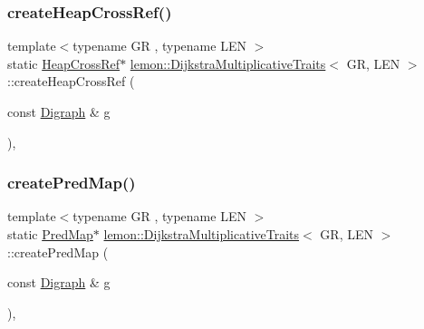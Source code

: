 \subsubsection{\texorpdfstring{create\+Heap\+Cross\+Ref()}{createHeapCrossRef()}}
{\footnotesize\ttfamily template$<$typename GR , typename L\+EN $>$ \\
static \hyperlink{structlemon_1_1_dijkstra_multiplicative_traits_a6cf2d1691e812bc74967eb6a96bb2110}{Heap\+Cross\+Ref}$\ast$ \hyperlink{structlemon_1_1_dijkstra_multiplicative_traits}{lemon\+::\+Dijkstra\+Multiplicative\+Traits}$<$ GR, L\+EN $>$\+::create\+Heap\+Cross\+Ref (\begin{DoxyParamCaption}\item[{const \hyperlink{structlemon_1_1_dijkstra_multiplicative_traits_a3ad6d100e3d5d097aaaac8e5733ce3a3}{Digraph} \&}]{g }\end{DoxyParamCaption})\hspace{0.3cm}{\ttfamily [inline]}, {\ttfamily [static]}}

\mbox{\label{structlemon_1_1_dijkstra_multiplicative_traits_a898d963d49216f0f90870442fbce38d5}} 
\subsubsection{\texorpdfstring{create\+Pred\+Map()}{createPredMap()}}
{\footnotesize\ttfamily template$<$typename GR , typename L\+EN $>$ \\
static \hyperlink{structlemon_1_1_dijkstra_multiplicative_traits_aa69cc345580a8a6619b0add76aae29e0}{Pred\+Map}$\ast$ \hyperlink{structlemon_1_1_dijkstra_multiplicative_traits}{lemon\+::\+Dijkstra\+Multiplicative\+Traits}$<$ GR, L\+EN $>$\+::create\+Pred\+Map (\begin{DoxyParamCaption}\item[{const \hyperlink{structlemon_1_1_dijkstra_multiplicative_traits_a3ad6d100e3d5d097aaaac8e5733ce3a3}{Digraph} \&}]{g }\end{DoxyParamCaption})\hspace{0.3cm}{\ttfamily [inline]}, {\ttfamily [static]}}

\mbox{\label{structlemon_1_1_dijkstra_multiplicative_traits_a7ecae716219efe0cafab361a597f90e3}} 
